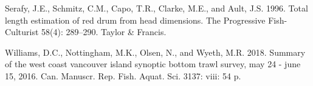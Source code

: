 \documentclass[12pt]{article}\usepackage[]{graphicx}\usepackage[]{color}
\begin{document}
\begin{CSLReferences}{1}{0}
%
Serafy, J.E., Schmitz, C.M., Capo, T.R., Clarke, M.E., and Ault, J.S. 1996. Total length estimation of red drum from head dimensions. The Progressive Fish-Culturist 58(4): 289--290. Taylor \& Francis.

%
Williams, D.C., Nottingham, M.K., Olsen, N., and Wyeth, M.R. 2018. Summary of the west coast vancouver island synoptic bottom trawl survey, may 24 - june 15, 2016. Can. Manuscr. Rep. Fish. Aquat. Sci. 3137: viii: 54 p.

\end{CSLReferences}
\end{document}
